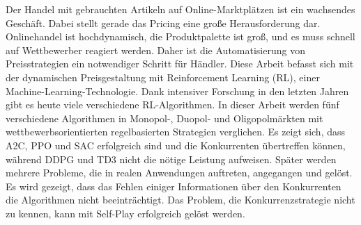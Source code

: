 Der Handel mit gebrauchten Artikeln auf Online-Marktplätzen ist ein wachsendes Geschäft.
Dabei stellt gerade das Pricing eine große Herausforderung dar.
Onlinehandel ist hochdynamisch, die Produktpalette ist groß, und es muss schnell auf Wettbewerber reagiert werden.
Daher ist die Automatisierung von Preisstrategien ein notwendiger Schritt für Händler.
Diese Arbeit befasst sich mit der dynamischen Preisgestaltung mit Reinforcement Learning (RL), einer Machine-Learning-Technologie.
Dank intensiver Forschung in den letzten Jahren gibt es heute viele verschiedene RL-Algorithmen.
In dieser Arbeit werden fünf verschiedene Algorithmen in Monopol-, Duopol- und Oligopolmärkten mit wettbewerbsorientierten regelbasierten Strategien verglichen.
Es zeigt sich, dass A2C, PPO und SAC erfolgreich sind und die Konkurrenten übertreffen können, während DDPG und TD3 nicht die nötige Leistung aufweisen.
Später werden mehrere Probleme, die in realen Anwendungen auftreten, angegangen und gelöst.
Es wird gezeigt, dass das Fehlen einiger Informationen über den Konkurrenten die Algorithmen nicht beeinträchtigt.
Das Problem, die Konkurrenzstrategie nicht zu kennen, kann mit Self-Play erfolgreich gelöst werden.